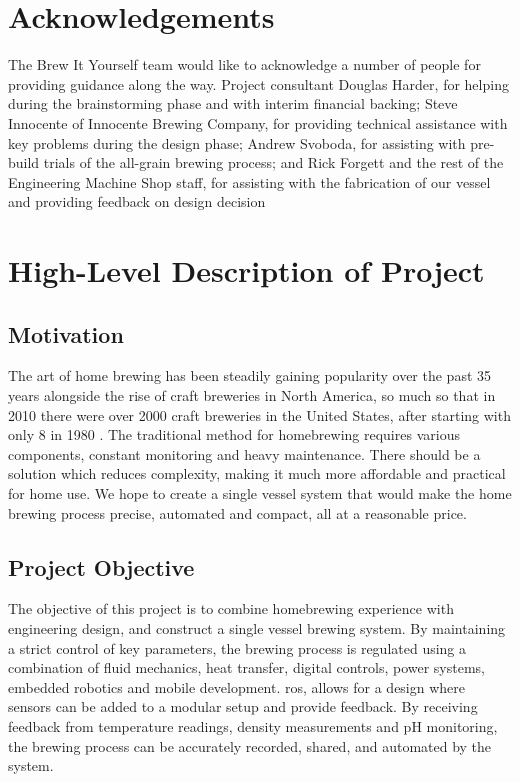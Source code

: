 \documentclass{article}
\begin{document}
\section*{Acknowledgements}
The Brew It Yourself team would like to acknowledge a number of people for providing guidance along the way. Project consultant Douglas Harder, for helping during the brainstorming phase and with interim financial backing; Steve Innocente of Innocente Brewing Company, for providing technical assistance with key problems during the design phase; Andrew Svoboda, for assisting with pre-build trials of the all-grain brewing process; and Rick Forgett and the rest of the Engineering Machine Shop staff, for assisting with the fabrication of our vessel and providing feedback on design decision

\pagebreak

\glsunsetall
\tableofcontents
\pagebreak
\listoffigures
\listoftables
\glsresetall

\pagebreak

\setcounter{section}{0}
\section{High-Level Description of Project}
\subsection{Motivation}
The art of home brewing has been steadily gaining popularity over the past 35 years alongside the rise of craft breweries in North America, so much so that in 2010 there were over 2000 craft breweries in the United States, after starting with only 8 in 1980 \cite{craft-beer}. The traditional method for homebrewing requires various components, constant monitoring and heavy maintenance. There should be a solution which reduces complexity, making it much more affordable and practical for home use. We hope to create a single vessel system that would make the home brewing process precise, automated and compact, all at a reasonable price.
\subsection{Project Objective}
The objective of this project is to combine homebrewing experience with engineering design, and construct a single vessel brewing system. By maintaining a strict control of key parameters, the brewing process is regulated using a combination of fluid mechanics, heat transfer, digital controls, power systems, embedded robotics and mobile development. \gls{ros}, allows for a design where sensors can be added to a modular setup and provide feedback. By receiving feedback from temperature readings, density measurements and pH monitoring, the brewing process can be accurately recorded, shared, and automated by the system. 
\end{document}
